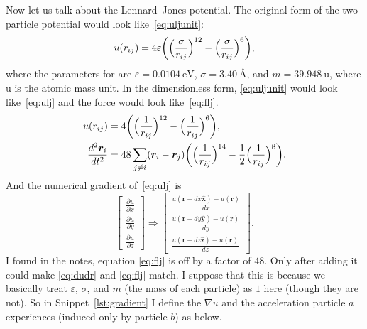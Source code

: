 Now let us talk about the Lennard--Jones potential.
The original form of the two-particle potential would look like~\eqref{eq:uljunit}:
%
\begin{equation}\label{eq:uljunit}
    u(r_{ij}) = 4 \varepsilon \biggl( \Bigl( \frac{ \sigma }{ r_{ij} } \Bigr)^{12}
    -\Bigl( \frac{ \sigma }{ r_{ij} } \Bigr)^6 \biggr),
\end{equation}
%
where the parameters for  are $\varepsilon = \SI{0.0104}{\electronvolt}$,
$\sigma = \SI{3.40}{\angstrom}$, and $m = \SI{39.948}{\atomicmassunit}$, where
$\si{\atomicmassunit}$ is the atomic mass unit.
In the dimensionless form,
\eqref{eq:uljunit} would look like~\eqref{eq:ulj} and the force would
look like~\eqref{eq:flj}.
%
\begin{align}
    u(r_{ij})                      & = 4 \biggl( \Bigl( \frac{ 1 }{ r_{ij} } \Bigr)^{12}
    -\Bigl( \frac{ 1 }{ r_{ij} } \Bigr)^6 \biggr), \label{eq:ulj}                        \\
    \frac{ d^2 \bm{r}_i }{ d t^2 } & = 48\sum_{j \neq i} (\bm{r}_i - \bm{r}_j)
    \biggl( \Bigl( \frac{ 1 }{ r_{ij} } \Bigr)^{14}
    -\frac{ 1 }{ 2 } \Bigl( \frac{ 1 }{ r_{ij} } \Bigr)^8 \biggr). \label{eq:flj}
\end{align}
%
And the numerical gradient of~\eqref{eq:ulj} is
%
\begin{equation}\label{eq:dudr}
    \begin{bmatrix}
        \frac{ \partial u }{ \partial x } \\
        \frac{ \partial u }{ \partial y } \\
        \frac{ \partial u }{ \partial z }
    \end{bmatrix}
    \Rightarrow
    \begin{bmatrix}
        \frac{ u(\bm{r} + dx \hat{\bm{x}}) - u(\bm{r}) }{ dx } \\
        \frac{ u(\bm{r} + dy \hat{\bm{y}}) - u(\bm{r}) }{ dy } \\
        \frac{ u(\bm{r} + dz \hat{\bm{z}}) - u(\bm{r}) }{ dz }
    \end{bmatrix}.
\end{equation}
%
I found in the notes, equation \eqref{eq:flj} is off by a factor of $48$.
Only after adding it could make \eqref{eq:dudr} and \eqref{eq:flj} match.
I suppose that this is because we basically treat
$\varepsilon$, $\sigma$, and $m$ (the mass of each particle) as $1$ here (though they
are not). So in Snippet~\ref{lst:gradient} I define the $\nabla u$ and the acceleration
particle $a$ experiences (induced only by particle $b$) as below.
